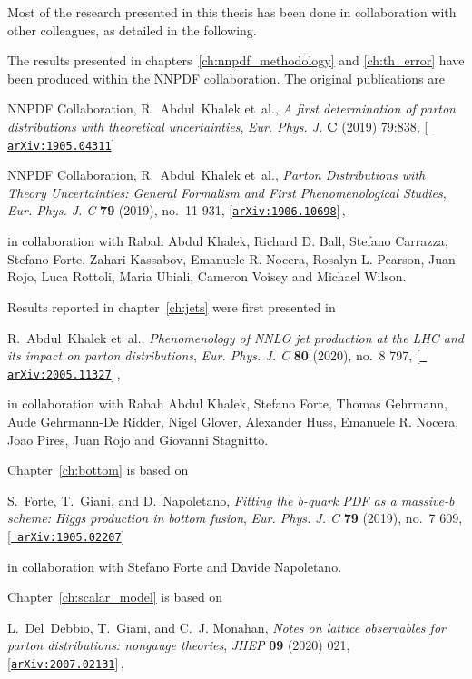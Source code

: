 \myemptypage

Most of the research presented in this thesis has been done in collaboration with other colleagues,
as detailed in the following.

The results presented in chapters~\ref{ch:nnpdf_methodology} and \ref{ch:th_error}
have been produced within the NNPDF collaboration. The original publications are

NNPDF Collaboration, R.~Abdul~Khalek et~al., {\it {A first determination
  of parton distributions with theoretical uncertainties}},  {\em Eur. Phys.
  J.} {\bf C} (2019) 79:838, [\href{http://arxiv.org/abs/1905.04311}{{\tt
  arXiv:1905.04311}}]

NNPDF Collaboration, R.~Abdul~Khalek et~al., {\it {Parton Distributions
  with Theory Uncertainties: General Formalism and First Phenomenological
  Studies}},  {\em Eur. Phys. J. C} {\bf 79} (2019), no.~11 931,
  [\href{http://arxiv.org/abs/1906.10698}{{\tt arXiv:1906.10698}}]\,,

in collaboration with Rabah Abdul Khalek, Richard D. Ball, Stefano Carrazza, Stefano Forte,
Zahari Kassabov, Emanuele R. Nocera, Rosalyn L. Pearson, Juan Rojo, Luca Rottoli,
Maria Ubiali, Cameron Voisey and Michael Wilson.


Results reported in chapter~\ref{ch:jets} were first presented in 

R.~Abdul~Khalek et~al., {\it {Phenomenology of NNLO jet production at the LHC
  and its impact on parton distributions}},  {\em Eur. Phys. J. C} {\bf 80}
  (2020), no.~8 797, [\href{http://arxiv.org/abs/2005.11327}{{\tt
  arXiv:2005.11327}}]\,,

in collaboration with Rabah Abdul Khalek, Stefano Forte, Thomas Gehrmann, Aude Gehrmann-De Ridder,
Nigel Glover, Alexander Huss, Emanuele R. Nocera, Joao Pires, Juan Rojo and Giovanni Stagnitto.

Chapter~\ref{ch:bottom} is based on

S.~Forte, T.~Giani, and D.~Napoletano, {\it {Fitting the b-quark PDF as a
  massive-b scheme: Higgs production in bottom fusion}},  {\em Eur. Phys. J. C}
  {\bf 79} (2019), no.~7 609, [\href{http://arxiv.org/abs/1905.02207}{{\tt
  arXiv:1905.02207}}]

in collaboration with Stefano Forte and Davide Napoletano.

Chapter~\ref{ch:scalar_model} is based on

L.~Del~Debbio, T.~Giani, and C.~J. Monahan, {\it {Notes on lattice observables
  for parton distributions: nongauge theories}},  {\em JHEP} {\bf 09} (2020)
  021, [\href{http://arxiv.org/abs/2007.02131}{{\tt arXiv:2007.02131}}]\,,

